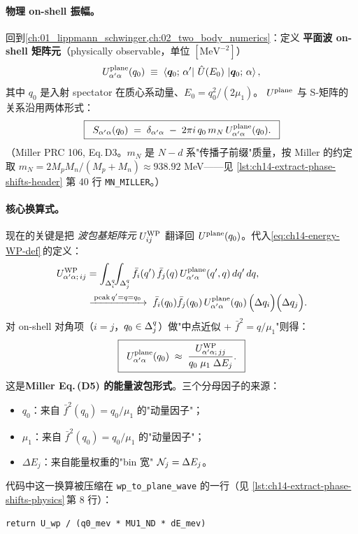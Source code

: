\paragraph{物理 on-shell 振幅。}
回到\cref{ch:01_lippmann_schwinger,ch:02_two_body_numerics}：定义
\textbf{平面波 on-shell 矩阵元}（physically observable，单位 \([\text{MeV}^{-2}]\)）
\begin{equation}
\label{eq:ch14-Uplane-def}
U^{\rm plane}_{\alpha'\alpha}(q_0) \;\equiv\;
\bra{\bm{q}_0;\, \alpha'}\,\hat{U}(E_0)\,\ket{\bm{q}_0;\, \alpha},
\end{equation}
其中 \(q_0\) 是入射 spectator 在质心系动量、\(E_0 = q_0^2/(2\mu_1)\)。
\(U^{\rm plane}\) 与 S-矩阵的关系沿用两体形式：
\begin{equation}
\label{eq:ch14-S-from-Uplane}
\boxed{\;\;
S_{\alpha'\alpha}(q_0) \;=\; \delta_{\alpha'\alpha}
\;-\; 2\pi i\, q_0\, m_N\, U^{\rm plane}_{\alpha'\alpha}(q_0).
\;\;}
\end{equation}
（Miller PRC 106, Eq.\,D3。\(m_N\) 是 \(N\!-\!d\) 系"传播子前缀"质量，按
Miller 的约定取 \(m_N = 2 M_p M_n /(M_p + M_n) \approx 938.92\) MeV——见
\cref{lst:ch14-extract-phase-shifts-header} 第 40 行 \verb|MN_MILLER|。）

\paragraph{核心换算式。}
现在的关键是把 \emph{波包基矩阵元} \(U^{\rm WP}_{ij}\) 翻译回
\(U^{\rm plane}(q_0)\)。代入\cref{eq:ch14-energy-WP-def}\(\,\)的定义：
\begin{align}
\label{eq:ch14-Uwp-vs-Uplane}
U^{\rm WP}_{\alpha'\alpha;\, ij}
&= \int_{\Delta_{i}^{q}}\!\!\int_{\Delta_{j}^{q}}
\bar{f}_i(q')\, \bar{f}_j(q)\,
U_{\alpha'\alpha}^{\rm plane}(q', q)\, dq'\, dq, \nonumber\\
&\xrightarrow{\;{\rm peak}\,q'=q=q_0\;}\;
\bar{f}_i(q_0)\bar{f}_j(q_0)\,
U^{\rm plane}_{\alpha'\alpha}(q_0)\,
\Big(\Delta q_i\Big)\Big(\Delta q_j\Big).
\end{align}
对 on-shell 对角项（\(i = j\)，\(q_0 \in \Delta_{j}^{q}\)）做"中点近似 +
\(\bar{f}^2 = q/\mu_1\)"则得：
\begin{equation}
\label{eq:ch14-WP-to-plane-final}
\boxed{\;\;
U^{\rm plane}_{\alpha'\alpha}(q_0)
\;\approx\;
\frac{U^{\rm WP}_{\alpha'\alpha;\, jj}}
     {q_0\;\mu_1\;\Delta E_j}.
\;\;}
\end{equation}
这是\textbf{Miller Eq.\,(D5) 的能量波包形式}。三个分母因子的来源：
\begin{itemize}
  \item \(q_0\)：来自 \(\bar{f}^2(q_0) = q_0/\mu_1\) 的"动量因子"；
  \item \(\mu_1\)：来自 \(\bar{f}^2(q_0) = q_0/\mu_1\) 的"动量因子"；
  \item \(\Delta E_j\)：来自能量权重的"bin 宽" \(\mathcal{N}_j = \Delta E_j\)。
\end{itemize}
代码中这一换算被压缩在 \texttt{wp\_to\_plane\_wave} 的一行（见
\cref{lst:ch14-extract-phase-shifts-physics}\(\,\)第 8 行）：
\begin{verbatim}
return U_wp / (q0_mev * MU1_ND * dE_mev)
\end{verbatim}

